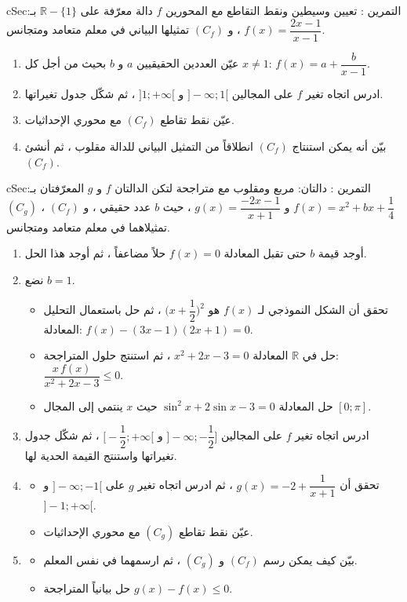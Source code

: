 \documentclass[12pt,a4paper]{article}
\newenvironment{BOX}[2]{\begin{otherlanguage}{english}\begin{arbox}{#1}{#2}}{\end{arbox}\end{otherlanguage}}
\newcounter{exo}
\newenvironment{tamrin}[1]{\stepcounter{exo}\begin{BOX}{cSec}{التمرين \theexo: #1}}{\end{BOX}}
\newcommand{\R}{\mathbb{R}}
\newenvironment{sq}{\begin{itemize}[leftmargin=2.4em,itemsep=3pt]}{\end{itemize}}
\newcommand{\qa}{\item[(أ)]}\newcommand{\qb}{\item[(ب)]}\newcommand{\qc}{\item[(جـ)]}\newcommand{\qd}{\item[(د)]}\newcommand{\qe}{\item[(هـ)]}
\begin{document}
\begin{tamrin}{تعيين وسيطين ونقط التقاطع مع المحورين}
$f$ دالة معرّفة على $\R-\{1\}$ بـ: $f(x)=\dfrac{2x-1}{x-1}$ ، و $(C_f)$ تمثيلها البياني في معلم متعامد ومتجانس.
\begin{enumerate}
\item عيّن العددين الحقيقيين $a$ و $b$ بحيث من أجل كل $x\ne1$: $f(x)=a+\dfrac{b}{x-1}$.
\item ادرس اتجاه تغير $f$ على المجالين $]-\infty;1[$ و $]1;+\infty[$ ، ثم شكّل جدول تغيراتها.
\item عيّن نقط تقاطع $(C_f)$ مع محوري الإحداثيات.
\item بيّن أنه يمكن استنتاج $(C_f)$ انطلاقاً من التمثيل البياني للدالة مقلوب ، ثم أنشئ $(C_f)$.
\end{enumerate}
\end{tamrin}

\begin{tamrin}{دالتان: مربع ومقلوب مع متراجحة}
لتكن الدالتان $f$ و $g$ المعرّفتان بـ: $f(x)=x^2+bx+\dfrac14$ و $g(x)=\dfrac{-2x-1}{x+1}$ ، حيث $b$ عدد حقيقي ، و $(C_f)$ ، $(C_g)$ تمثيلاهما في معلم متعامد ومتجانس.
\begin{enumerate}
\item أوجد قيمة $b$ حتى تقبل المعادلة $f(x)=0$ حلاً مضاعفاً ، ثم أوجد هذا الحل.
\item نضع $b=1$.
\begin{sq}
\qa تحقق أن الشكل النموذجي لـ $f(x)$ هو $\Big(x+\dfrac12\Big)^2$ ، ثم حل باستعمال التحليل المعادلة: $f(x)-(3x-1)(2x+1)=0$.
\qb حل في $\R$ المعادلة $x^2+2x-3=0$ ، ثم استنتج حلول المتراجحة: $\dfrac{x\,f(x)}{x^2+2x-3}\le0$.
\qc حل المعادلة $\sin^2x+2\sin x-3=0$ حيث $x$ ينتمي إلى المجال $[0;\pi]$.
\end{sq}
\item ادرس اتجاه تغير $f$ على المجالين $\Big]-\infty;-\dfrac12\Big]$ و $\Big[-\dfrac12;+\infty\Big[$ ، ثم شكّل جدول تغيراتها واستنتج القيمة الحدية لها.
\item
\begin{sq}
\qa تحقق أن $g(x)=-2+\dfrac1{x+1}$ ، ثم ادرس اتجاه تغير $g$ على $]-\infty;-1[$ و $]-1;+\infty[$.
\qb عيّن نقط تقاطع $(C_g)$ مع محوري الإحداثيات.
\end{sq}
\item
\begin{sq}
\qa بيّن كيف يمكن رسم $(C_f)$ و $(C_g)$ ، ثم ارسمهما في نفس المعلم.
\qb حل بيانياً المتراجحة $g(x)-f(x)\le0$.
\end{sq}
\end{enumerate}
\end{tamrin}
\end{document}
